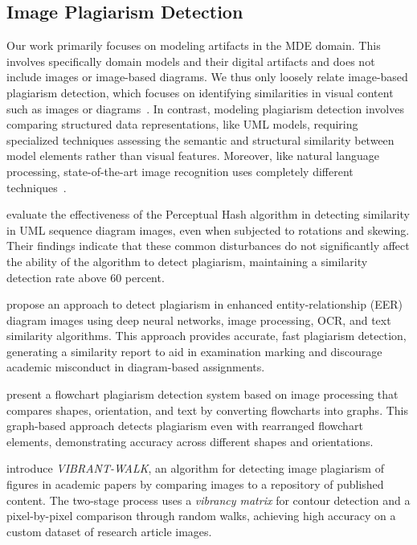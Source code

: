\subsection{Image Plagiarism Detection}
Our work primarily focuses on modeling artifacts in the MDE domain. This involves specifically domain models and their digital artifacts and does not include images or image-based diagrams.
We thus only loosely relate image-based plagiarism detection, which focuses on identifying similarities in visual content such as images or diagrams~\cite{Ovhal2015, hurtik2015, meuschke2018}. In contrast, modeling plagiarism detection involves comparing structured data representations, like UML models, requiring specialized techniques assessing the semantic and structural similarity between model elements rather than visual features.
Moreover, like natural language processing, state-of-the-art image recognition uses completely different techniques~\cite{li2022, Shafiq2022}.

\citet{umam2021} evaluate the effectiveness of the Perceptual Hash algorithm in detecting similarity in UML sequence diagram images, even when subjected to rotations and skewing. Their findings indicate that these common disturbances do not significantly affect the ability of the algorithm to detect plagiarism, maintaining a similarity detection rate above 60 percent.

\citet{dahanayake2021} propose an approach to detect plagiarism in enhanced entity-relationship (EER) diagram images using deep neural networks, image processing, OCR, and text similarity algorithms. This approach provides accurate, fast plagiarism detection, generating a similarity report to aid in examination marking and discourage academic misconduct in diagram-based assignments.

\citet{skuruvila2017} present a flowchart plagiarism detection system based on image processing that compares shapes, orientation, and text by converting flowcharts into graphs. This graph-based approach detects plagiarism even with rearranged flowchart elements, demonstrating accuracy across different shapes and orientations.

\citet{parmar2024} introduce \textit{VIBRANT-WALK}, an algorithm for detecting image plagiarism of figures in academic papers by comparing images to a repository of published content. The two-stage process uses a \textit{vibrancy matrix} for contour detection and a pixel-by-pixel comparison through random walks, achieving high accuracy on a custom dataset of research article images.

